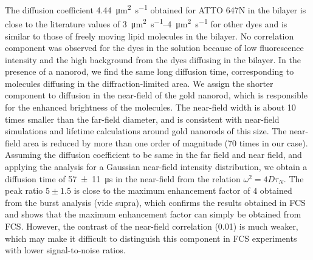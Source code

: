 The diffusion coefficient \SI{4.44}{\um\squared\per\s} obtained for ATTO 647N in the bilayer is close to the literature values of \SIrange{3}{4}{\um\squared\per\s}\cite{mach2010lipid} for other dyes and is similar to those of freely moving lipid molecules in the bilayer.
No correlation component was observed for the dyes in the solution because of low fluorescence intensity and the high background from the dyes diffusing in the bilayer.
In the presence of a nanorod, we find the same long diffusion time, corresponding to molecules diffusing in the diffraction-limited area.
We assign the shorter component to diffusion in the near-field of the gold nanorod, which is  responsible for the enhanced brightness of the molecules.
The near-field width is about 10 times smaller than the far-field diameter, and is consistent with near-field simulations and lifetime calculations around gold nanorods
of this size.\cite{khatua2014resonant,seelig2007nanoparticleinduced}
The near-field area is reduced by more than one order of magnitude (70 times in our case).
Assuming the diffusion coefficient to be same in the far field and near field, and applying the analysis for a Gaussian near-field intensity distribution, we obtain a diffusion 
time of \SI[separate-uncertainty = true]{57(11)}{\us} in the near-field from the relation $\omega^2=4D\tau_N$.
The peak ratio $5\pm1.5$ is close to the maximum enhancement factor of $4$ obtained from the burst analysis (vide supra), which confirms the results 
obtained in FCS and shows that the maximum enhancement factor can simply be obtained from FCS.
However, the contrast of the near-field correlation (0.01) is much weaker, which may make it difficult to distinguish this component in FCS experiments with lower signal-to-noise ratios.


